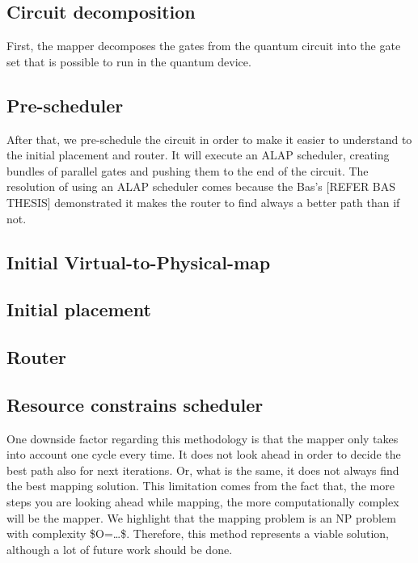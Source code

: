 \subsection*{Circuit decomposition}
\label{sec:org49b5cb7}

First, the mapper decomposes the gates from the quantum circuit into the gate set that is possible to run in the quantum device.

\subsection*{Pre-scheduler}
\label{sec:orgf4b22e5}

After that, we pre-schedule the circuit in order to make it easier to understand to the initial placement and router.
It will execute an ALAP scheduler, creating bundles of parallel gates and pushing them to the end of the circuit.
The resolution of using an ALAP scheduler comes because the Bas's [REFER BAS THESIS] demonstrated it makes the router to find always a better path than if not.

\subsection*{Initial Virtual-to-Physical-map}
\label{sec:org044f176}
\subsection*{Initial placement}
\label{sec:orga33631f}
\subsection*{Router}
\label{sec:orgcf8c155}
\subsection*{Resource constrains scheduler}
\label{sec:org806faa7}
One downside factor regarding this methodology is that the mapper only takes into account one cycle every time.
It does not look ahead in order to decide the best path also for next iterations.
Or, what is the same, it does not always find the best mapping solution.
This limitation comes from the fact that, the more steps you are looking ahead while mapping, the more computationally complex will be the mapper.
We highlight that the mapping problem is an NP problem with complexity \$O=\ldots{}\$.
Therefore, this method represents a viable solution, although a lot of future work should be done.

